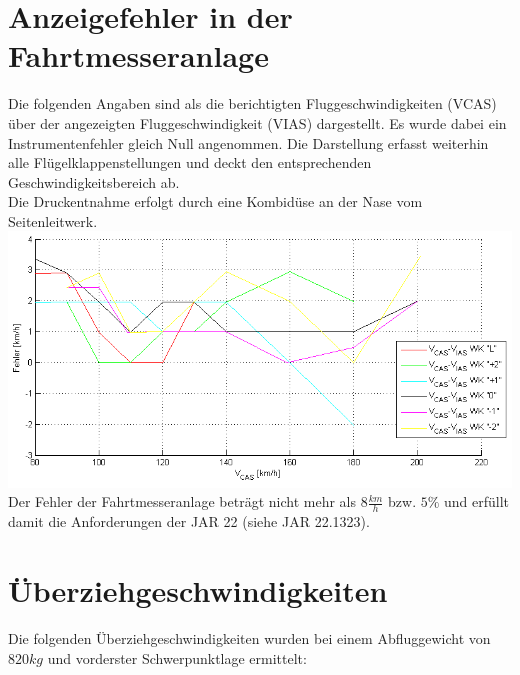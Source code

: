 \section{Anzeigefehler in der Fahrtmesseranlage}
Die folgenden Angaben sind als die berichtigten Fluggeschwindigkeiten (VCAS) über der angezeigten Fluggeschwindigkeit (VIAS) dargestellt. Es wurde dabei ein Instrumentenfehler gleich Null angenommen. Die Darstellung erfasst weiterhin alle Flügelklappenstellungen und deckt den entsprechenden Geschwindigkeitsbereich ab.\\
\newline
Die Druckentnahme erfolgt durch eine Kombidüse an der Nase vom Seitenleitwerk.\\
\newline
\includegraphics[width=.9\textwidth]{fahrtmesserkalibrierung.png}
\newline
Der Fehler der Fahrtmesseranlage beträgt nicht mehr als $8 \frac{km}{h}$ bzw. $5\%$ und erfüllt damit die Anforderungen der JAR 22 (siehe JAR 22.1323).

\section{Überziehgeschwindigkeiten}

Die folgenden Überziehgeschwindigkeiten wurden bei einem Abfluggewicht von $820kg$ und vorderster Schwerpunktlage ermittelt:

